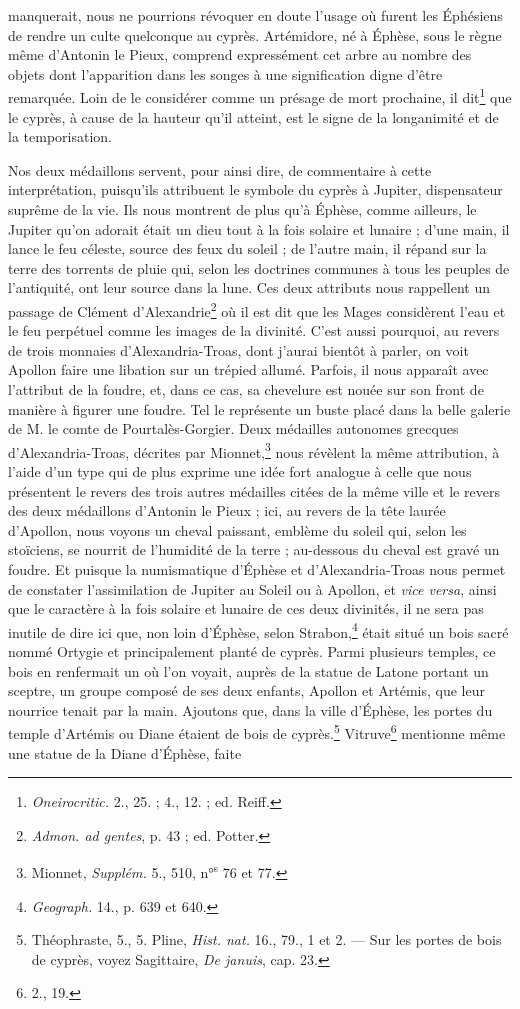 \documentclass{article}
\begin{document}
manquerait, nous ne pourrions révoquer en doute l'usage où furent les Éphésiens de rendre un culte quelconque au cyprès. Artémidore, né à Éphèse, sous le règne même d'Antonin le Pieux, comprend expressément cet arbre au nombre des objets dont l'apparition dans les songes à une signification digne d'être remarquée. Loin de le considérer comme un présage de mort prochaine, il dit\footnote{\emph{Oneirocritic.} 2., 25. ; 4., 12. ; ed. Reiff.} que le cyprès, à cause de la hauteur qu'il atteint, est le signe de la longanimité et de la temporisation.

Nos deux médaillons servent, pour ainsi dire, de commentaire à cette interprétation, puisqu'ils attribuent le symbole du cyprès à Jupiter, dispensateur suprême de la vie. Ils nous montrent de plus qu'à Éphèse, comme ailleurs, le Jupiter qu'on adorait était un dieu tout à la fois solaire et lunaire ; d'une main, il lance le feu céleste, source des feux du soleil ; de l'autre main, il répand sur la terre des torrents de pluie qui, selon les doctrines communes à tous les peuples de l'antiquité, ont leur source dans la lune. Ces deux attributs nous rappellent un passage de Clément d'Alexandrie\footnote{\emph{Admon. ad gentes}, p. 43 ; ed. Potter.} où il est dit que les Mages considèrent l'eau et le feu perpétuel comme les images de la divinité. C'est aussi pourquoi, au revers de trois monnaies d'Alexandria-Troas, dont j'aurai bientôt à parler, on voit Apollon faire une libation sur un trépied allumé. Parfois, il nous apparaît avec l'attribut de la foudre, et, dans ce cas, sa chevelure est nouée sur son front de manière à figurer une foudre. Tel le représente un buste placé dans la belle galerie de M. le comte de Pourtalès-Gorgier. Deux médailles autonomes grecques d'Alexandria-Troas, décrites par Mionnet,\footnote{Mionnet, \emph{Supplém.} 5., 510, n°\textsuperscript{s} 76 et 77.} nous révèlent la même attribution, à l'aide d'un type qui de plus exprime une idée fort analogue à celle que nous présentent le revers des trois autres médailles citées de la même ville et le revers des deux médaillons d'Antonin le Pieux ; ici, au revers de la tête laurée d'Apollon, nous voyons un cheval paissant, emblème du soleil qui, selon les stoïciens, se nourrit de l'humidité de la terre ; au-dessous du cheval est gravé un foudre. Et puisque la numismatique d'Éphèse et d'Alexandria-Troas nous permet de constater l'assimilation de Jupiter au Soleil ou à Apollon, et \emph{vice versa}, ainsi que le caractère à la fois solaire et lunaire de ces deux divinités, il ne sera pas inutile de dire ici que, non loin d'Éphèse, selon Strabon,\footnote{\emph{Geograph.} 14., p. 639 et 640.} était situé un bois sacré nommé Ortygie et principalement planté de cyprès. Parmi plusieurs temples, ce bois en renfermait un où l'on voyait, auprès de la statue de Latone portant un sceptre, un groupe composé de ses deux enfants, Apollon et Artémis, que leur nourrice tenait par la main. Ajoutons que, dans la ville d'Éphèse, les portes du temple d'Artémis ou Diane étaient de bois de cyprès.\footnote{Théophraste, 5., 5. Pline, \emph{Hist. nat.} 16., 79., 1 et 2. --- Sur les portes de bois de cyprès, voyez Sagittaire, \emph{De januis}, cap. 23.} Vitruve\footnote{2., 19.} mentionne même une statue de la Diane d'Éphèse, faite 
\end{document}
